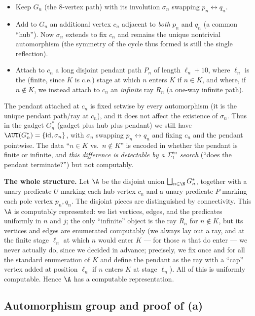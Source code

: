 \begin{itemize}
\item Keep $G_n$ (the $8$-vertex path) with its involution $\sigma_n$
swapping $p_n\leftrightarrow q_n$.
\item Add to $G_n$ an additional vertex $c_n$ adjacent to \emph{both} $p_n$ and
$q_n$ (a common ``hub''). Now $\sigma_n$ extends to fix $c_n$ and remains the
unique nontrivial automorphism (the symmetry of the cycle thus formed is still the
single reflection).
\item Attach to $c_n$ a long disjoint pendant path $P_n$ of length $\ell_n+10$,
where $\ell_n$ is the (finite, since $K$ is c.e.) stage at which $n$ enters $K$ if
$n\in K$, and where, if $n\notin K$, we instead attach to $c_n$ an \emph{infinite}
ray $R_n$ (a one-way infinite path).
\end{itemize}

The pendant attached at $c_n$ is fixed setwise by every automorphism (it is the
unique pendant path/ray at $c_n$), and it does not affect the existence of
$\sigma_n$. Thus in the gadget $G_n^\ast$ (gadget plus hub plus pendant) we still
have $\AUT(G_n^\ast)=\{\mathrm{id},\sigma_n\}$, with $\sigma_n$ swapping
$p_n\leftrightarrow q_n$ and fixing $c_n$ and the pendant pointwise. The data
``$n\in K$ vs.\ $n\notin K$'' is encoded in whether the pendant is finite or
infinite, and \emph{this difference is detectable by a $\Sigma^{in}_1$ search}
(``does the pendant terminate?'') but not computably.

\medskip

\noindent\textbf{The whole structure.}
Let $\A$ be the disjoint union $\bigsqcup_{n\in\N} G_n^\ast$, together with a unary
predicate $U$ marking each hub vertex $c_n$ and a unary predicate $P$ marking each
pole vertex $p_n,q_n$. The disjoint pieces are distinguished by connectivity. This
$\A$ is computably represented: we list vertices, edges, and the predicates
uniformly in $n$ and $j$; the only ``infinite'' object is the ray $R_n$ for
$n\notin K$, but its vertices and edges are enumerated computably (we always lay
out a ray, and at the finite stage $\ell_n$ at which $n$ would enter $K$ — for those
$n$ that do enter — we never actually do, since we decided in advance; precisely, we
fix once and for all the standard enumeration of $K$ and define the pendant as the
ray with a ``cap'' vertex added at position $\ell_n$ if $n$ enters $K$ at stage
$\ell_n$). All of this is uniformly computable. Hence $\A$ has a computable
representation.

\subsection{Automorphism group and proof of (a)}

